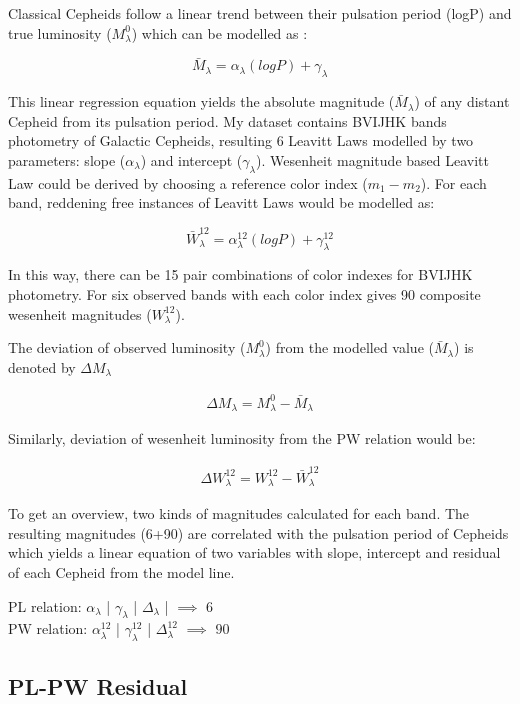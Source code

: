 \documentclass[12pt,a4paper]{article}
\begin{document}
Classical Cepheids follow a linear trend between their pulsation period (logP) and true luminosity ($M_\lambda^0$) which can be modelled as :

$$\bar{M}_\lambda = \alpha_\lambda (logP) + \gamma_\lambda$$

This linear regression equation yields the absolute magnitude ($\bar{M}_\lambda$) of any distant Cepheid from its pulsation period. My dataset contains BVIJHK bands photometry of Galactic Cepheids, resulting 6 Leavitt Laws modelled by two parameters: slope ($\alpha_\lambda$) and intercept ($\gamma_\lambda$). Wesenheit magnitude based Leavitt Law could be derived by choosing a reference color index ($m_1 - m_2$). For each band, reddening free instances of Leavitt Laws would be modelled as: 

$$\bar{W}_\lambda^{12} = \alpha_\lambda^{12} (logP) + \gamma_\lambda^{12}$$

In this way, there can be 15 pair combinations of color indexes for BVIJHK photometry. For six observed bands with each color index gives 90 composite wesenheit magnitudes ($W_\lambda^{12}$).   

The deviation of observed luminosity ($M_\lambda^0$) from the modelled value ($\bar{M}_\lambda$) is denoted by $\Delta M_\lambda$

\begin{align*}
    \Delta M_\lambda = M_\lambda^0 - \bar{M}_\lambda
\end{align*}

Similarly, deviation of wesenheit luminosity from the PW relation would be:

\begin{align*}
    \Delta W_\lambda^{12} = W_\lambda^{12} - \bar{W}_\lambda^{12}
\end{align*}

To get an overview, two kinds of magnitudes calculated for each band. The resulting magnitudes (6+90) are correlated with the pulsation period of Cepheids which yields a linear equation of two variables with slope, intercept and residual of each Cepheid from the model line.
\begin{center}
    PL relation: $\alpha_\lambda$ | $\gamma_\lambda$ | $\Delta_\lambda $ |  $\implies$  $6$ \\
    PW relation: $\alpha_\lambda^{12}$ | $\gamma_\lambda^{12} $  | $\Delta_\lambda^{12}$ $\implies$  $90$
\end{center} 


\subsection{PL-PW Residual}
\end{document}
